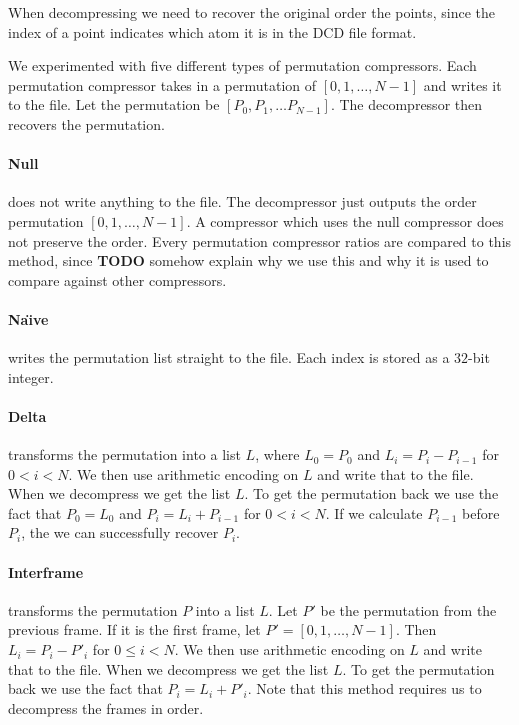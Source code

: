 \documentclass{report}
\begin{document}
When decompressing we need to recover the original order the points, since the
index of a point indicates which atom it is in the DCD file format.

We experimented with five different types of permutation compressors. Each
permutation compressor takes in a permutation of $[0,1,\dots,N-1]$ and writes
it to the file. Let the permutation be $[P_0, P_1, \dots P_{N-1}]$.  The
decompressor then recovers the permutation.

\paragraph{Null} does not write anything to the file. The decompressor just 
outputs the order permutation $[0,1,\dots,N-1]$. A compressor which uses the
null compressor does not preserve the order. Every permutation compressor
ratios are compared to this method, since \textbf{TODO} somehow explain why we
use this and why it is used to compare against other compressors.

\paragraph{Na\"{\i}ve} writes the permutation list straight to the file. Each index
is stored as a $32$-bit integer.

\paragraph{Delta} transforms the permutation into a list $L$, where $L_0 =
P_0$ and $L_i = P_i - P_{i-1}$ for $0 < i < N$. We then use arithmetic
encoding on $L$ and write that to the file. When we decompress we get the list
$L$. To get the permutation back we use the fact that $P_0 = L_0$ and $P_i =
L_i + P_{i-1}$ for $0 < i < N$. If we calculate $P_{i-1}$ before $P_{i}$, the
we can successfully recover $P_{i}$.

\paragraph{Interframe} transforms the permutation $P$ into a list $L$. Let
$P'$ be the permutation from the previous frame. If it is the first frame, let
$P' = [0,1,\dots,N-1]$. Then $L_i = P_i - P'_i$ for $0 \le i < N$. We then use
arithmetic encoding on $L$ and write that to the file. When we decompress we
get the list $L$. To get the permutation back we use the fact that $P_i = L_i
+ P'_i$. Note that this method requires us to decompress the frames in order.
\end{document}
